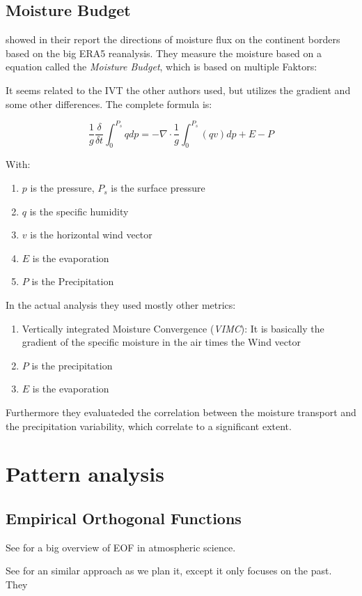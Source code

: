 \subsection{Moisture Budget}

\citeauthor{atmos13101694} showed in their report \cite{atmos13101694} the directions of moisture flux on the continent borders based on the big ERA5 reanalysis.
They measure the moisture based on a equation called the \textit{Moisture Budget}, which is based on multiple Faktors: 



It seems related to the IVT the other authors used, but utilizes the gradient and some other differences. The complete formula is:

$$
\frac{1}{g} \frac{\delta}{\delta t} \int^{P_s}_0 q dp = - \nabla \cdot \frac{1}{g} \int^{P_s}_0 (qv) dp + E - P
$$

With: 

\begin{enumerate}
  \item $p$ is the pressure, $P_s$ is the surface pressure
  \item $q$ is the specific humidity
  \item $v$ is the horizontal wind vector
  \item $E$ is the evaporation
  \item $P$ is the Precipitation
\end{enumerate}


In the actual analysis they used mostly other metrics:


\begin{enumerate}
  \item Vertically integrated Moisture Convergence (\textit{VIMC}): It is basically the gradient of the specific moisture in the air times the Wind vector
  \item $P$ is the precipitation 
  \item $E$ is the evaporation
\end{enumerate}

Furthermore they evaluateded the correlation between the moisture transport and the precipitation variability, which correlate to a significant extent.

\section{Pattern analysis}

\subsection{Empirical Orthogonal Functions}

See \cite{hannachi2007eof_review} for a big overview of EOF in atmospheric science.

See \cite{Ayantobo2021IntegratedMT} for an similar approach as we plan it, except it only focuses on the past.
They 
